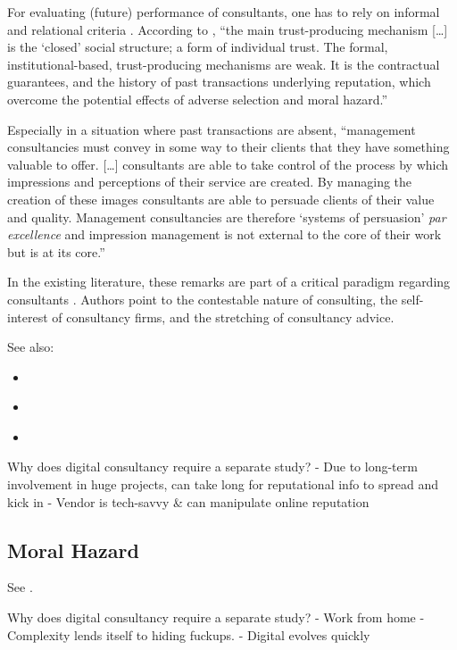 \documentclass[12pt]{article}
\providecommand{\tightlist}{%
  \setlength{\itemsep}{0pt}\setlength{\parskip}{0pt}}
\begin{document}
For evaluating (future) performance of consultants, one has to rely on
informal and relational criteria \citep[ 277]{wright2002}. According to
\citet[250]{clark1993}, ``the main trust-producing mechanism
{[}\ldots{]} is the `closed' social structure; a form of individual
trust. The formal, institutional-based, trust-producing mechanisms are
weak. It is the contractual guarantees, and the history of past
transactions underlying reputation, which overcome the potential effects
of adverse selection and moral hazard.''

Especially in a situation where past transactions are absent,
``management consultancies must convey in some way to their clients that
they have something valuable to offer. {[}\ldots{]} consultants are able
to take control of the process by which impressions and perceptions of
their service are created. By managing the creation of these images
consultants are able to persuade clients of their value and quality.
Management consultancies are therefore `systems of persuasion' \emph{par
excellence} and impression management is not external to the core of
their work but is at its core.'' \citep[ 35]{clark1998}

In the existing literature, these remarks are part of a critical
paradigm regarding consultants \citep[ 4-5]{armbruster2006}. Authors
point to the contestable nature of consulting, the self-interest of
consultancy firms, and the stretching of consultancy advice.

See also:

\begin{itemize}
\tightlist
\item
  \citep{wright2002}
\item
  \citep{david2013}
\item
  \citep{mahoney2016}
\end{itemize}

Why does digital consultancy require a separate study? - Due to
long-term involvement in huge projects, can take long for reputational
info to spread and kick in - Vendor is tech-savvy \& can manipulate
online reputation

\hypertarget{moral-hazard}{%
\subsection{Moral Hazard}\label{moral-hazard}}

See \citep[ 72-73]{armbruster2006}.

Why does digital consultancy require a separate study? - Work from home
- Complexity lends itself to hiding fuckups. - Digital evolves quickly
\end{document}
